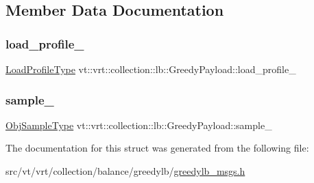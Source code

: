 \subsection{Member Data Documentation}
\mbox{\label{structvt_1_1vrt_1_1collection_1_1lb_1_1_greedy_payload_afb95c0d993a5e23a1b66d7c411d5a415}} 
\subsubsection{\texorpdfstring{load\+\_\+profile\+\_\+}{load\_profile\_}}
{\footnotesize\ttfamily \hyperlink{structvt_1_1vrt_1_1collection_1_1lb_1_1_greedy_l_b_types_a8af324cd88e83727178631e4d1478932}{Load\+Profile\+Type} vt\+::vrt\+::collection\+::lb\+::\+Greedy\+Payload\+::load\+\_\+profile\+\_\+\hspace{0.3cm}{\ttfamily [protected]}}

\mbox{\label{structvt_1_1vrt_1_1collection_1_1lb_1_1_greedy_payload_a06b7ae7ccf00d3d7afcf7398e632ca9c}} 
\subsubsection{\texorpdfstring{sample\+\_\+}{sample\_}}
{\footnotesize\ttfamily \hyperlink{structvt_1_1vrt_1_1collection_1_1lb_1_1_greedy_l_b_types_a467f8a79d0785fca5fc95bd5c0f406b9}{Obj\+Sample\+Type} vt\+::vrt\+::collection\+::lb\+::\+Greedy\+Payload\+::sample\+\_\+\hspace{0.3cm}{\ttfamily [protected]}}



The documentation for this struct was generated from the following file\+:\begin{DoxyCompactItemize}
\item 
src/vt/vrt/collection/balance/greedylb/\hyperlink{greedylb__msgs_8h}{greedylb\+\_\+msgs.\+h}\end{DoxyCompactItemize}
